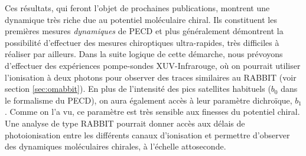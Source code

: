 Ces résultats, qui feront l'objet de prochaines publications, montrent une dynamique très riche due au potentiel moléculaire chiral. Ils constituent les premières mesures \textit{dynamiques} de PECD et plus généralement démontrent la possibilité d'effectuer des mesures chiroptiques ultra-rapides, très difficiles à réaliser par ailleurs. Dans la suite logique de cette démarche, nous prévoyons d'effectuer des expériences pompe-sondes XUV-Infrarouge, où on pourrait utiliser l'ionisation à deux photons pour observer des traces similaires au RABBIT (voir section \ref{sec:omabbit}). En plus de l'intensité des pics satellites habituels ($b_0$ dans le formalisme du PECD), on aura également accès à leur paramètre dichroïque, $b_1$. Comme on l'a vu, ce paramètre est très sensible aux finesses du potentiel chiral. Une analyse de type RABBIT pourrait donner accès aux délais de photoionisation entre les différents canaux d'ionisation et permettre d'observer des dynamiques moléculaires chirales, à l'échelle attoseconde. 
